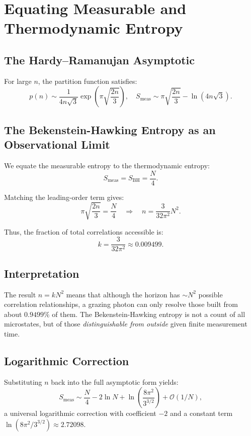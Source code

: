 \documentclass[12pt, letterpaper]{article}
\begin{document}
\section{Equating Measurable and Thermodynamic Entropy}

\subsection{The Hardy–Ramanujan Asymptotic}

For large $n$, the partition function satisfies:
\begin{equation}
p(n) \sim \frac{1}{4n\sqrt{3}} \exp\left( \pi \sqrt{\frac{2n}{3}} \right),
\quad
S_{\mathrm{meas}} \sim \pi \sqrt{\frac{2n}{3}} - \ln(4n\sqrt{3}).
\label{eq:HR}
\end{equation}

\subsection{The Bekenstein-Hawking Entropy as an Observational Limit}

We equate the measurable entropy to the thermodynamic entropy:
\[
S_{\mathrm{meas}} = S_{\mathrm{BH}} = \frac{N}{4}.
\]

Matching the leading-order term gives:
\[
\pi \sqrt{\frac{2n}{3}} = \frac{N}{4}
\quad\Rightarrow\quad
n = \frac{3}{32\pi^2} N^2.
\]

Thus, the fraction of total correlations accessible is:
\begin{equation}
k = \frac{3}{32\pi^2} \approx 0.009499.
\label{eq:k}
\end{equation}

\subsection{Interpretation}

The result $n = k N^2$ means that although the horizon has $\sim N^2$ possible correlation relationships, a grazing photon can only resolve those built from about $0.9499\%$ of them. The Bekenstein-Hawking entropy is not a count of all microstates, but of those \emph{distinguishable from outside} given finite measurement time.

\subsection{Logarithmic Correction}

Substituting $n$ back into the full asymptotic form yields:
\[
S_{\mathrm{meas}} \sim \frac{N}{4} - 2\ln N + \ln\left(\frac{8\pi^{2}}{3^{3/2}}\right) + \mathcal{O}(1/N),
\]
a universal logarithmic correction with coefficient $-2$ and a constant term $\ln(8\pi^{2}/3^{3/2}) \approx 2.72098$.
\end{document}
